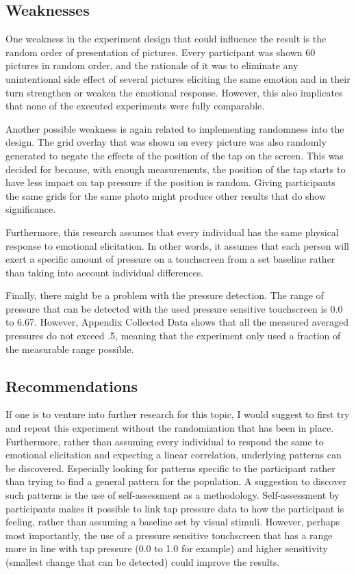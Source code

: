 \documentclass{sigchi}
\begin{document}
\subsection{Weaknesses}
One weakness in the experiment design that could influence the result is the random order of presentation of pictures. Every participant was shown 60 pictures in random order, and the rationale of it was to eliminate any unintentional side effect of several pictures eliciting the same emotion and in their turn strengthen or weaken the emotional response. However, this also implicates that none of the executed experiments were fully comparable.

Another possible weakness is again related to implementing randomness into the design. The grid overlay that was shown on every picture was also randomly generated to negate the effects of the position of the tap on the screen. This was decided for because, with enough measurements, the position of the tap starts to have less impact on tap pressure if the position is random. Giving participants the same grids for the same photo might produce other results that do show significance.

Furthermore, this research assumes that every individual has the same physical response to emotional elicitation. In other words, it assumes that each person will exert a specific amount of pressure on a touchscreen from a set baseline rather than taking into account individual differences.

Finally, there might be a problem with the pressure detection. The range of pressure that can be detected with the used pressure sensitive touchscreen is 0.0 to 6.67. However, Appendix Collected Data shows that all the measured averaged pressures do not exceed .5, meaning that the experiment only used a fraction of the measurable range possible.

\subsection{Recommendations} %
\label{sub:recommendations}
If one is to venture into further research for this topic, I would suggest to first try and repeat this experiment without the randomization that has been in place. Furthermore, rather than assuming every individual to respond the same to emotional elicitation and expecting a linear correlation, underlying patterns can be discovered. Especially looking for patterns specific to the participant rather than trying to find a general pattern for the population. A suggestion to discover such patterns is the use of self-assessment as a methodology. Self-assessment by participants makes it possible to link tap pressure data to how the participant is feeling, rather than assuming a baseline set by visual stimuli. However, perhaps most importantly, the use of a pressure sensitive touchscreen that has a range more in line with tap pressure (0.0 to 1.0 for example) and higher sensitivity (smallest change that can be detected) could improve the results.
\end{document}
